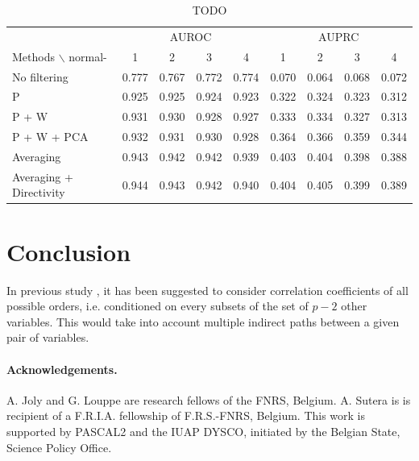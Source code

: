 \documentclass[wcp]{jmlr}
\begin{document}
\begin{table}[tbh]
\centering
\caption{TODO}
\begin{tabular}{@{}l *{8}{c}@{}}
\toprule
  & \multicolumn{4}{c}{AUROC} & \multicolumn{4}{c}{AUPRC} \\
\cmidrule(r){2-5}\cmidrule(r){6-9}
Methods $\backslash$ normal- & 1 & 2 & 3 & 4 & 1 & 2 & 3 & 4 \\
\midrule
No  filtering       & 0.777 & 0.767 & 0.772 & 0.774 & 0.070 & 0.064 & 0.068 & 0.072\\
P                   & 0.925 & 0.925 & 0.924 & 0.923 & 0.322 & 0.324 & 0.323 & 0.312\\
P + W               & 0.931 & 0.930 & 0.928 & 0.927 & 0.333 & 0.334 & 0.327 & 0.313\\
P + W + PCA         & 0.932 & 0.931 & 0.930 & 0.928 & 0.364 & 0.366 & 0.359 & 0.344\\
Averaging           & 0.943 & 0.942 & 0.942 & 0.939 & 0.403 & 0.404 & 0.398 & 0.388\\
Averaging + Directivity & 0.944 & 0.943 & 0.942 & 0.940 & 0.404 & 0.405 & 0.399 & 0.389\\
\bottomrule
\end{tabular}
\end{table}





\section{Conclusion} \label{sec:conclusion}

In previous study \cite{shipley2002cause}, it has been suggested to
consider correlation coefficients of all possible orders,
i.e. conditioned on every subsets of the set of $p-2$ other variables. This
would take into account multiple indirect paths between a given pair of
variables.





\begin{scriptsize}

\paragraph{Acknowledgements.} A. Joly and G. Louppe are research fellows of
the FNRS, Belgium.  A. Sutera is  is recipient of
a F.R.I.A. fellowship of F.R.S.-FNRS, Belgium.
This work is supported by PASCAL2 and the IUAP DYSCO, initiated by the
Belgian State, Science Policy Office.

\end{scriptsize}
\end{document}
